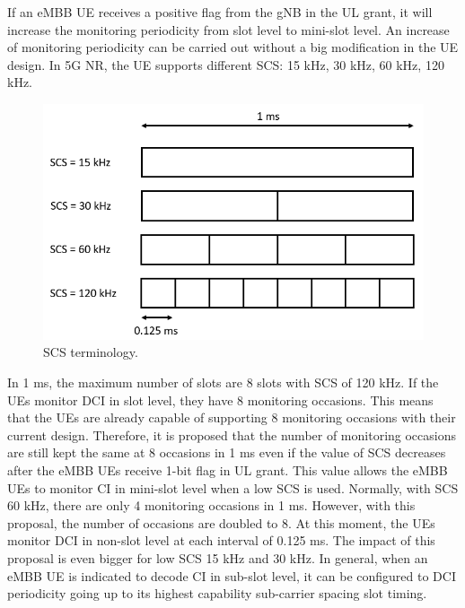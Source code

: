 \documentclass{ieeeaccess}
\begin{document}
If an eMBB UE receives a positive flag from the gNB in the UL grant, it will increase the monitoring periodicity from slot level to mini-slot level. An increase of monitoring periodicity can be carried out without a big modification in the UE design. In 5G NR, the UE supports different SCS: 15 kHz, 30 kHz, 60 kHz, 120 kHz. 

\begin{figure}[htbp]
\centerline{\includegraphics[scale=0.3]{fig9.PNG}}
\caption{SCS terminology.}
\label{fig9}
\vspace{-6mm}
\end{figure}

In 1 ms, the maximum number of slots are 8 slots with SCS of 120 kHz. If the UEs monitor DCI in slot level, they have 8 monitoring occasions. This means that the UEs are already capable of supporting 8 monitoring occasions with their current design. Therefore, it is proposed that the number of monitoring occasions are still kept the same at 8 occasions in 1 ms even if the value of SCS decreases after the eMBB UEs receive 1-bit flag in UL grant. This value allows the eMBB UEs to monitor CI in mini-slot level when a low SCS is used. Normally, with SCS 60 kHz, there are only 4 monitoring occasions in 1 ms. However, with this proposal, the number of occasions are doubled to 8. At this moment, the UEs monitor DCI in non-slot level at each interval of 0.125 ms. The impact of this proposal is even bigger for low SCS 15 kHz and 30 kHz. In general, when an eMBB UE is indicated to decode CI in sub-slot level, it can be configured to DCI periodicity going up to its highest capability sub-carrier spacing slot timing. 
\end{document}
